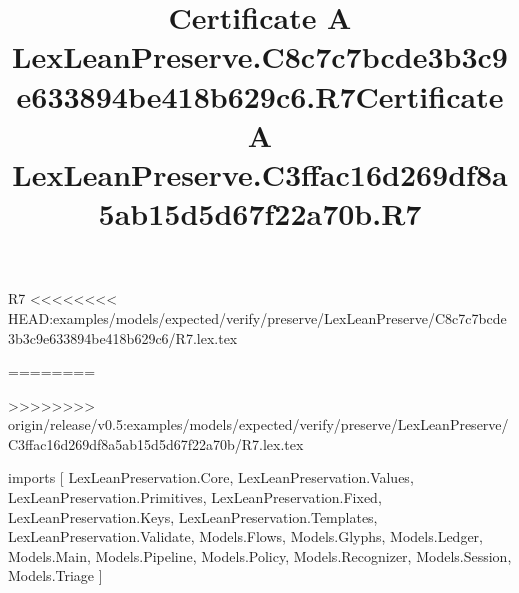 \begin{lexlean}{R7}
<<<<<<<< HEAD:examples/models/expected/verify/preserve/LexLeanPreserve/C8c7c7bcde3b3c9e633894be418b629c6/R7.lex.tex
\title{Certificate A LexLeanPreserve.C8c7c7bcde3b3c9e633894be418b629c6.R7}
========
\title{Certificate A LexLeanPreserve.C3ffac16d269df8a5ab15d5d67f22a70b.R7}
>>>>>>>> origin/release/v0.5:examples/models/expected/verify/preserve/LexLeanPreserve/C3ffac16d269df8a5ab15d5d67f22a70b/R7.lex.tex
\begin{coremodule}
imports [
  LexLeanPreservation.Core,
  LexLeanPreservation.Values,
  LexLeanPreservation.Primitives,
  LexLeanPreservation.Fixed,
  LexLeanPreservation.Keys,
  LexLeanPreservation.Templates,
  LexLeanPreservation.Validate,
  Models.Flows,
  Models.Glyphs,
  Models.Ledger,
  Models.Main,
  Models.Pipeline,
  Models.Policy,
  Models.Recognizer,
  Models.Session,
  Models.Triage
]


\end{coremodule}
\end{lexlean}
